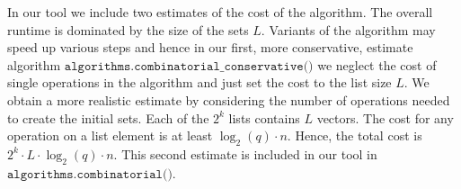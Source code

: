In our tool we include two estimates of the cost of the algorithm. The overall runtime is dominated by the size of the sets $L$. Variants of the algorithm may speed up various steps and hence in our first, more conservative, estimate algorithm $\texttt{algorithms.combinatorial\_conservative()}$ we neglect the cost of single operations in the algorithm and just set the cost to the list size $L$. We obtain a more realistic estimate by considering the number of operations needed to create the initial sets. Each of the $2^k$ lists contains $L$ vectors. The cost for any operation on a list element is at least $\log_2(q) \cdot n$. Hence, the total cost is $2^k \cdot L \cdot \log_2(q) \cdot n$. This second estimate is included in our tool in $\texttt{algorithms.combinatorial()}$.


